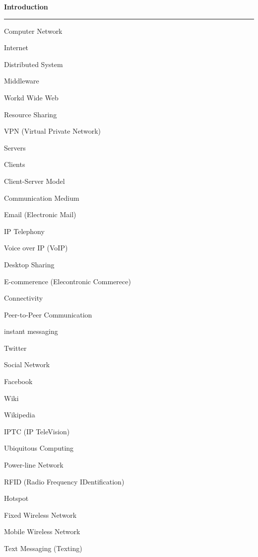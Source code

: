 {\bf Introduction}
\vskip 1mm
\hrule

\vskip 1cm
Computer Network

\filbreak
\vskip 3mm
Internet

\filbreak
\vskip 3mm
Distributed System

\filbreak
\vskip 3mm
Middleware

\filbreak
\vskip 3mm
Workd Wide Web

\filbreak
\vskip 3mm
Resource Sharing

\filbreak
\vskip 3mm
VPN (Virtual Private Network)

\filbreak
\vskip 3mm
Servers

\filbreak
\vskip 3mm
Clients

\filbreak
\vskip 3mm
Client-Server Model

\filbreak
\vskip 3mm
Communication Medium

\filbreak
\vskip 3mm
Email (Electronic Mail)

\filbreak
\vskip 3mm
IP Telephony

\filbreak
\vskip 3mm
Voice over IP (VoIP)

\filbreak
\vskip 3mm
Desktop Sharing

\filbreak
\vskip 3mm
E-commerence (Elecontronic Commerece)

\filbreak
\vskip 3mm
Connectivity

\filbreak
\vskip 3mm
Peer-to-Peer Communication

\filbreak
\vskip 3mm
instant messaging

\filbreak
\vskip 3mm
Twitter

\filbreak
\vskip 3mm
Social Network

\filbreak
\vskip 3mm
Facebook

\filbreak
\vskip 3mm
Wiki

\filbreak
\vskip 3mm
Wikipedia

\filbreak
\vskip 3mm
IPTC (IP TeleVision)

\filbreak
\vskip 3mm
Ubiquitous Computing

\filbreak
\vskip 3mm
Power-line Network

\filbreak
\vskip 3mm
RFID (Radio Frequency IDentification)

\filbreak
\vskip 3mm
Hotspot

\filbreak
\vskip 3mm
Fixed Wireless Network

\filbreak
\vskip 3mm
Mobile Wireless Network

\filbreak
\vskip 3mm
Text Messaging (Texting)

